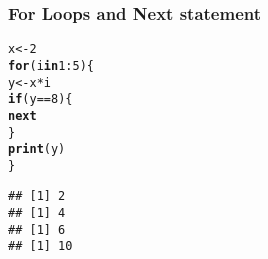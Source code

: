\documentclass[12pt]{beamer}\usepackage[]{graphicx}\usepackage[]{color}
\makeatletter
\newcommand{\hlnum}[1]{\textcolor[rgb]{0.686,0.059,0.569}{#1}}%
\newcommand{\hlopt}[1]{\textcolor[rgb]{0,0,0}{#1}}%
\newcommand{\hlstd}[1]{\textcolor[rgb]{0.345,0.345,0.345}{#1}}%
\newcommand{\hlkwa}[1]{\textcolor[rgb]{0.161,0.373,0.58}{\textbf{#1}}}%
\newcommand{\hlkwb}[1]{\textcolor[rgb]{0.69,0.353,0.396}{#1}}%
\newcommand{\hlkwd}[1]{\textcolor[rgb]{0.737,0.353,0.396}{\textbf{#1}}}%
\newenvironment{kframe}{%
 \def\at@end@of@kframe{}%
 \ifinner\ifhmode%
  \def\at@end@of@kframe{\end{minipage}}%
  \begin{minipage}{\columnwidth}%
 \fi\fi%
 \def\FrameCommand##1{\hskip\@totalleftmargin \hskip-\fboxsep
 \colorbox{shadecolor}{##1}\hskip-\fboxsep
     \hskip-\linewidth \hskip-\@totalleftmargin \hskip\columnwidth}%
 \MakeFramed {\advance\hsize-\width
   \@totalleftmargin\z@ \linewidth\hsize
   \@setminipage}}%
 {\par\unskip\endMakeFramed%
 \at@end@of@kframe}
\newenvironment{knitrout}{}{} %
\makeatother
\begin{document}
\begin{frame}[fragile]
\frametitle{For Loops and Next statement}

\begin{knitrout}\footnotesize
{}\color{fgcolor}\begin{kframe}
\begin{alltt}
\hlstd{x} \hlkwb{<-} \hlnum{2}
\hlkwa{for} \hlstd{(i} \hlkwa{in} \hlnum{1}\hlopt{:}\hlnum{5}\hlstd{) \{}
  \hlstd{y} \hlkwb{<-} \hlstd{x} \hlopt{*} \hlstd{i}
  \hlkwa{if} \hlstd{(y} \hlopt{==} \hlnum{8}\hlstd{) \{}
    \hlkwa{next}
  \hlstd{\}}
  \hlkwd{print}\hlstd{(y)}
\hlstd{\}}
\end{alltt}
\begin{verbatim}
## [1] 2
## [1] 4
## [1] 6
## [1] 10
\end{verbatim}
\end{kframe}
\end{knitrout}

\end{frame}

\end{document}
